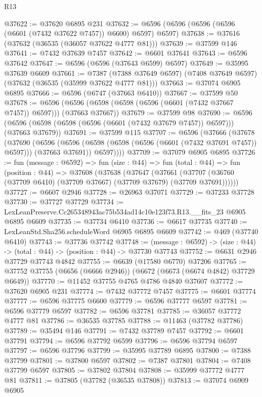 \begin{lexlean}{R13}
\begin{coremodule}
@37622 := @37620 @6895 @231
@37632 := @6596 (@6596 (@6596 (@6596 (@6601 (@7432 @37622 @7457)) @6600) @6597) @6597)
@37638 := @37616 (@37632 (@36535 (@36057 @37622 @4777 @81)))
@37639 := @37599 @146
@37641 := @7432 @37639 @7457
@37642 := @6601 @37641
@37643 := @6596 @37642
@37647 := @6596 (@6596 (@37643 @6599) @6597)
@37649 := @35995 @37639 @6609
@37661 := @7387
    (@7388 @37649 @6597)
    (@7408 @37649 @6597)
    (@37632 (@36535 (@35999 @37622 @4777 @81)))
@37663 := @37074 @6905 @6895
@37666 := @6596 (@6747 (@37663 @6410))
@37667 := @37599 @50
@37678 := @6596 (@6596 (@6598 (@6598 (@6596 (@6601 (@7432 @37667 @7457)) @6597))) (@37663 @37667))
@37679 := @37599 @98
@37690 := @6596 (@6596 (@6598 (@6598 (@6596 (@6601 (@7432 @37679 @7457)) @6597))) (@37663 @37679))
@37691 := @37599 @115
@37707 := @6596
    (@37666
      (@37678
        (@37690
          (@6596
            (@6596 (@6598 (@6598 (@6596 (@6601 (@7432 @37691 @7457)) @6597))) (@37663 @37691))
            @6597))))
@37709 := @37079 @6905 @6895
@37726 := fun (message : @6592) =>
  fun (size : @44) =>
  fun (total : @44) =>
  fun (position : @44) =>
  @37608
    (@37638
      (@37647
        (@37661 (@37707 (@36760 (@37709 @6410) (@37709 @37667) (@37709 @37679) (@37709 @37691))))))
@37727 := @6607 @2946
@37728 := @26963 @37071
@37729 := @37233 @37728
@37730 := @37727 @37729
@37734 := LexLeanPreserve.Cc265348943ac75b534ad14c10e123f73.R13.__fits_23 @6905 @6895 @6609
@37735 := @37734 @6410
@37736 := @6617 @37735
@37740 := LexLeanStd.Sha256.scheduleWord @6905 @6895 @6609
@37742 := @469 (@37740 @6410)
@37743 := @37736 @37742
@37748 := (message : @6592) -> (size : @44) -> (total : @44) -> (position : @44) -> @37730 @37743
@37752 := @6631 @2946 @37729 @37743 @4842
@37755 := @6639 (@17580 @6770) @37206
@37765 := @37752 @37755 (@6656 (@6666 @2946)) (@6672 (@6673 (@6674 @4842) @37729 @6649))
@37770 := @11452 @37755 @4765 @4786 @4840 @37607
@37772 := @37620 @6905 @231
@37774 := @7432 @37772 @7457
@37775 := @6601 @37774
@37777 := @6596 @37775 @6600
@37779 := @6596 @37777 @6597
@37781 := @6596 @37779 @6597
@37782 := @6596 @37781
@37785 := @36057 @37772 @4777 @81
@37786 := @36535 @37785
@37788 := @11463 (@37782 @37786)
@37789 := @35494 @146
@37791 := @7432 @37789 @7457
@37792 := @6601 @37791
@37794 := @6596 @37792 @6599
@37796 := @6596 @37794 @6597
@37797 := @6596 @37796
@37799 := @35995 @37789 @6895
@37800 := @7388 @37799
@37801 := @37800 @6597
@37802 := @7387 @37801
@37804 := @7408 @37799 @6597
@37805 := @37802 @37804
@37808 := @35999 @37772 @4777 @81
@37811 := @37805 (@37782 (@36535 @37808))
@37813 := @37074 @6909 @6905

\end{coremodule}
\end{lexlean}

